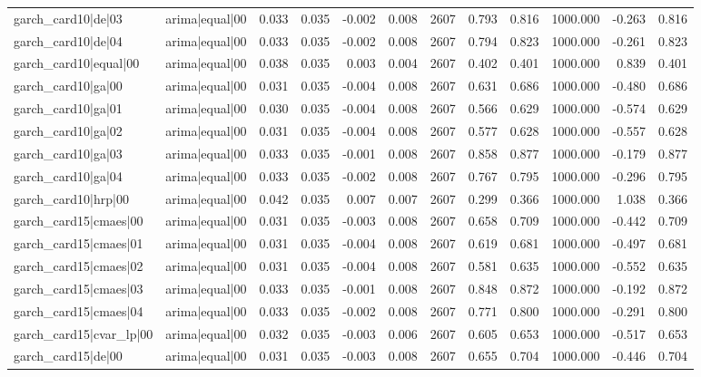 \begin{table}
\begin{tabular}{llrrrrrrrrrr}
garch\_card10|de|03 & arima|equal|00 & 0.033 & 0.035 & -0.002 & 0.008 & 2607 & 0.793 & 0.816 & 1000.000 & -0.263 & 0.816 \\
garch\_card10|de|04 & arima|equal|00 & 0.033 & 0.035 & -0.002 & 0.008 & 2607 & 0.794 & 0.823 & 1000.000 & -0.261 & 0.823 \\
garch\_card10|equal|00 & arima|equal|00 & 0.038 & 0.035 & 0.003 & 0.004 & 2607 & 0.402 & 0.401 & 1000.000 & 0.839 & 0.401 \\
garch\_card10|ga|00 & arima|equal|00 & 0.031 & 0.035 & -0.004 & 0.008 & 2607 & 0.631 & 0.686 & 1000.000 & -0.480 & 0.686 \\
garch\_card10|ga|01 & arima|equal|00 & 0.030 & 0.035 & -0.004 & 0.008 & 2607 & 0.566 & 0.629 & 1000.000 & -0.574 & 0.629 \\
garch\_card10|ga|02 & arima|equal|00 & 0.031 & 0.035 & -0.004 & 0.008 & 2607 & 0.577 & 0.628 & 1000.000 & -0.557 & 0.628 \\
garch\_card10|ga|03 & arima|equal|00 & 0.033 & 0.035 & -0.001 & 0.008 & 2607 & 0.858 & 0.877 & 1000.000 & -0.179 & 0.877 \\
garch\_card10|ga|04 & arima|equal|00 & 0.033 & 0.035 & -0.002 & 0.008 & 2607 & 0.767 & 0.795 & 1000.000 & -0.296 & 0.795 \\
garch\_card10|hrp|00 & arima|equal|00 & 0.042 & 0.035 & 0.007 & 0.007 & 2607 & 0.299 & 0.366 & 1000.000 & 1.038 & 0.366 \\
garch\_card15|cmaes|00 & arima|equal|00 & 0.031 & 0.035 & -0.003 & 0.008 & 2607 & 0.658 & 0.709 & 1000.000 & -0.442 & 0.709 \\
garch\_card15|cmaes|01 & arima|equal|00 & 0.031 & 0.035 & -0.004 & 0.008 & 2607 & 0.619 & 0.681 & 1000.000 & -0.497 & 0.681 \\
garch\_card15|cmaes|02 & arima|equal|00 & 0.031 & 0.035 & -0.004 & 0.008 & 2607 & 0.581 & 0.635 & 1000.000 & -0.552 & 0.635 \\
garch\_card15|cmaes|03 & arima|equal|00 & 0.033 & 0.035 & -0.001 & 0.008 & 2607 & 0.848 & 0.872 & 1000.000 & -0.192 & 0.872 \\
garch\_card15|cmaes|04 & arima|equal|00 & 0.033 & 0.035 & -0.002 & 0.008 & 2607 & 0.771 & 0.800 & 1000.000 & -0.291 & 0.800 \\
garch\_card15|cvar\_lp|00 & arima|equal|00 & 0.032 & 0.035 & -0.003 & 0.006 & 2607 & 0.605 & 0.653 & 1000.000 & -0.517 & 0.653 \\
garch\_card15|de|00 & arima|equal|00 & 0.031 & 0.035 & -0.003 & 0.008 & 2607 & 0.655 & 0.704 & 1000.000 & -0.446 & 0.704 \\

\end{tabular}
\end{table}
